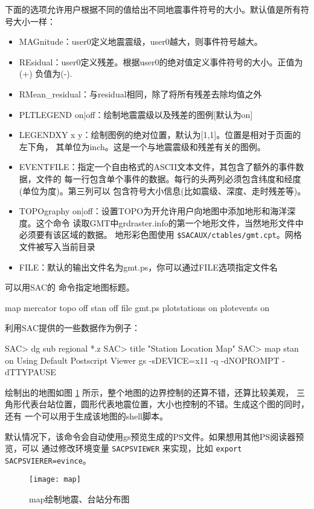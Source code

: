下面的选项允许用户根据不同的值给出不同地震事件符号的大小。默认值是所有符号大小一样：
\begin{itemize}
\item MAGnitude：user0定义地震震级，user0越大，则事件符号越大。
\item REsidual：user0定义残差。根据user0的绝对值定义事件符号的大小。正值为(+) 负值为(-).
\item RMean\_residual：与residual相同，除了将所有残差去除均值之外
\item PLTLEGEND on|off：绘制地震震级以及残差的图例[默认为on]
\item LEGENDXY x y：绘制图例的绝对位置，默认为[1,1]。位置是相对于页面的左下角，
    其单位为inch。这是一个与地震震级和残差有关的图例。
\item EVENTFILE：指定一个自由格式的ASCII文本文件，其包含了额外的事件数据，文件的
    每一行包含单个事件的数据。每行的头两列必须包含纬度和经度(单位为度)。第三列可以
    包含符号大小信息(比如震级、深度、走时残差等)。
\item TOPOgraphy on|off：设置TOPO为开允许用户向地图中添加地形和海洋深度。这个命令
    读取GMT中grdraster.info的第一个地形文件，当然地形文件中必须要有该区域的数据。
    地形彩色图使用 \verb|$SACAUX/ctables/gmt.cpt|。网格文件被写入当前目录
\item FILE：默认的输出文件名为gmt.ps，你可以通过FILE选项指定文件名
\end{itemize}
可以用SAC的  命令指定地图标题。

\begin{SACDFT}
map mercator topo off stan off file gmt.ps plotstations on
    plotevents on
\end{SACDFT}

利用SAC提供的一些数据作为例子：
\begin{SACCode}
SAC> dg sub regional *.z
SAC> title "Station Location Map"
SAC> map stan on
Using Default Postscript Viewer
	gs -sDEVICE=x11 -q -dNOPROMPT -dTTYPAUSE
\end{SACCode}
绘制出的地图如图 \ref{fig:map} 所示，整个地图的边界控制的还算不错，还算比较美观，
三角形代表台站位置，圆形代表地震位置，大小也控制的不错。生成这个图的同时，还有
一个可以用于生成该地图的shell脚本。

默认情况下，该命令会自动使用gs预览生成的PS文件。如果想用其他PS阅读器预览，可以
通过修改环境变量 \texttt{SACPSVIEWER} 来实现，比如 \texttt{export SACPSVIERER=evince}。

\begin{figure}[!ht]
\centering
\texttt{[image: map]}
\caption{map绘制地震、台站分布图}
\label{fig:map}
\end{figure}

